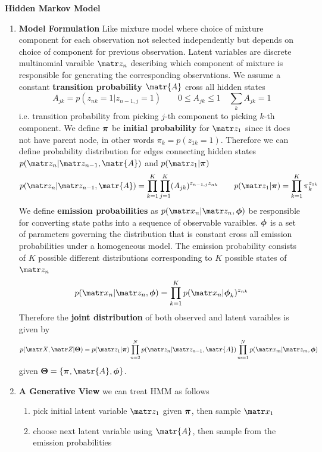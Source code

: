 \documentclass[11pt]{article}
\begin{document}
\newpage

\begin{defn*}
    \textbf{Hidden Markov Model} 
    \begin{enumerate}
        \item \textbf{Model Formulation} Like mixture model where choice of mixture component for each observation not selected independently but depends on choice of component for previous observation. Latent variables are discrete multinomial varaible $\bz_n$ describing which component of mixture is responsible for generating the corresponding observations. We assume a constant \textbf{transition probability} $\matr{A}$ cross all hidden states
        \[
            A_{jk} = p(z_{nk}=1 | z_{n-1,j} = 1)
            \qquad 0\leq A_{jk}\leq 1 
            \quad \sum_k A_{jk} = 1
        \]
        i.e. transition probability from picking $j$-th component to picking $k$-th component. We define $\boldsymbol{\pi}$ be \textbf{initial probability} for $\bz_1$ since it does not have parent node, in other words $\pi_k = p(z_{1k}=1)$. Therefore we can define probability distribution for edges connecting hidden states $p(\bz_n | \bz_{n-1}, \matr{A})$ and $p(\bz_1 | \bpi)$
        \[
            p(\bz_n | \bz_{n-1}, \matr{A}) = \prod_{k=1}^K \prod_{j=1}^K (A_{jk})^{z_{n-1, j} z_{nk}}
            \qquad 
            p(\bz_1 | \bpi) = \prod_{k=1}^K \pi_k^{z_{1k}}
        \]
        We define \textbf{emission probabilities} as $p(\bx_n | \bz_n , \bphi)$ be responsible for converting state paths into a sequence of observable varaibles. $\boldsymbol{\phi}$ is a set of parameters governing the distribution that is constant cross all emission probabilities under a homogeneous model. The emission probability consists of $K$ possible different distributions corresponding to $K$ possible states of $\bz_n$ 
        \[
            p(\bx_n | \bz_n , \bphi)=  \prod_{k=1}^K p(\bx_n | \bphi_k)^{z_{nk}}    
        \]
        Therefore the \textbf{joint distribution} of both observed and latent varaibles is given by 
        \[
            p(\bX, \bZ | \bTheta) = p(\bz_1 | \bpi) \prod_{n=2}^N p(\bz_n | \bz_{n-1}, \matr{A}) \prod_{m=1}^N p(\bx_m | \bz_m, \bphi)    
        \]
        given $\bTheta = \{ \bpi, \matr{A}, \bphi \}$. 
        \item \textbf{A Generative View} we can treat HMM as follows 
        \begin{enumerate}
            \item pick initial latent variable $\bz_1$ given $\boldsymbol{\pi}$, then sample $\bx_1$
            \item choose next latent variable using $\matr{A}$, then sample from the emission probabilities

\end{enumerate}
\end{enumerate}
\end{defn*}
\end{document}
